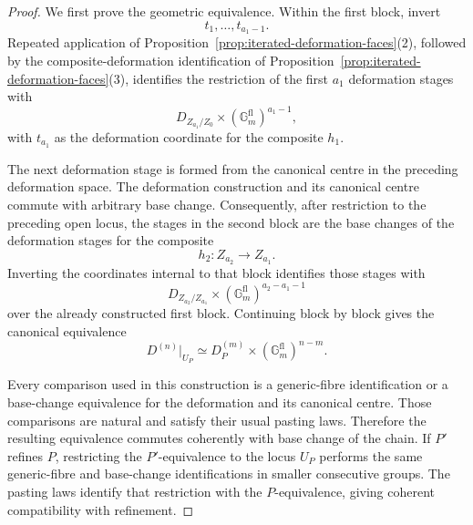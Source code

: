\begin{proof}
We first prove the geometric equivalence.  Within the first block, invert
\[
    t_1,\ldots,t_{a_1-1}.
\]
Repeated application of
Proposition~\ref{prop:iterated-deformation-faces}(2), followed by the
composite-deformation identification of
Proposition~\ref{prop:iterated-deformation-faces}(3), identifies the
restriction of the first \(a_1\) deformation stages with
\[
    D_{Z_{a_1}/Z_0}
    \times
    (\mathbb G_m^{\mathrm{fl}})^{a_1-1},
\]
with \(t_{a_1}\) as the deformation coordinate for the composite
\(h_1\).

The next deformation stage is formed from the canonical centre in the
preceding deformation space.  The deformation construction and its
canonical centre commute with arbitrary base change.  Consequently, after
restriction to the preceding open locus, the stages in the second block are
the base changes of the deformation stages for the composite
\[
    h_2:Z_{a_2}\longrightarrow Z_{a_1}.
\]
Inverting the coordinates internal to that block identifies those stages
with
\[
    D_{Z_{a_2}/Z_{a_1}}
    \times
    (\mathbb G_m^{\mathrm{fl}})^{a_2-a_1-1}
\]
over the already constructed first block.  Continuing block by block gives
the canonical equivalence
\[
    D^{(n)}|_{U_P}
    \simeq
    D_P^{(m)}
    \times
    (\mathbb G_m^{\mathrm{fl}})^{n-m}.
\]

Every comparison used in this construction is a generic-fibre
identification or a base-change equivalence for the deformation and its
canonical centre.  Those comparisons are natural and satisfy their usual
pasting laws.  Therefore the resulting equivalence commutes coherently with
base change of the chain.  If \(P'\) refines \(P\), restricting the
\(P'\)-equivalence to the locus \(U_P\) performs the same generic-fibre and
base-change identifications in smaller consecutive groups.  The pasting
laws identify that restriction with the \(P\)-equivalence, giving coherent
compatibility with refinement.

\end{proof}


